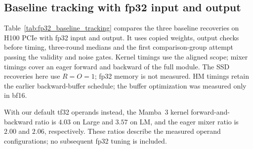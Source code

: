 \subsection{Baseline tracking with fp32 input and output}
\label{app:fp32_baseline_tracking}
Table~\ref{tab:fp32_baseline_tracking} compares the three baseline recoveries
on H100 PCIe with fp32 input and output. It uses copied weights, output checks
before timing, three-round medians and the first comparison-group attempt
passing the validity and noise gates. Kernel timings use the aligned scope;
mixer timings cover an eager forward and backward of the full module.
The SSD recoveries here use $R=O=1$; fp32 memory is not measured.
HM timings retain the earlier backward-buffer schedule; the buffer
optimization was measured only in bf16.

\begin{table}[!htbp]
\centering\scriptsize
\caption{Baseline tracking with fp32 input/output: time ratios ours/official
($<1$ means ours is faster), geometric mean with min--max underneath over four
Large or six LM shapes. Mamba~1 uses IEEE arithmetic, Mamba~2 uses tf32,
and our Mamba~3 recovery uses its opt-in bf16-operand mode to match the
official implementation's internal operand casts. The Mamba~3 row is not
a comparison of full-fp32 scan arithmetic. PyTorch~2.14, Triton~3.8.}
\label{tab:fp32_baseline_tracking}
\end{table}

With our default tf32 operands instead, the Mamba~3 kernel forward-and-backward
ratio is $4.03$ on Large and $3.57$ on LM, and the eager mixer ratio is $2.00$
and $2.06$, respectively. These ratios describe the measured operand configurations; no subsequent
fp32 tuning is included.
